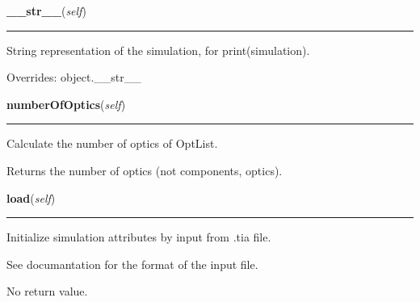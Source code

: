     \vspace{0.5ex}

\hspace{.8\funcindent}\begin{boxedminipage}{\funcwidth}

    \raggedright \textbf{\_\_str\_\_}(\textit{self})

    \vspace{-1.5ex}

    \rule{\textwidth}{0.5\fboxrule}
\setlength{\parskip}{2ex}
    String representation of the simulation, for print(simulation).

\setlength{\parskip}{1ex}
      Overrides: object.\_\_str\_\_

    \end{boxedminipage}

    \label{theia:running:simulation:Simulation:numberOfOptics}

    \vspace{0.5ex}

\hspace{.8\funcindent}\begin{boxedminipage}{\funcwidth}

    \raggedright \textbf{numberOfOptics}(\textit{self})

    \vspace{-1.5ex}

    \rule{\textwidth}{0.5\fboxrule}
\setlength{\parskip}{2ex}
    Calculate the number of optics of OptList.

    Returns the number of optics (not components, optics).

\setlength{\parskip}{1ex}
    \end{boxedminipage}

    \label{theia:running:simulation:Simulation:load}

    \vspace{0.5ex}

\hspace{.8\funcindent}\begin{boxedminipage}{\funcwidth}

    \raggedright \textbf{load}(\textit{self})

    \vspace{-1.5ex}

    \rule{\textwidth}{0.5\fboxrule}
\setlength{\parskip}{2ex}
    Initialize simulation attributes by input from .tia file.

    See documantation for the format of the input file.

    No return value.

\setlength{\parskip}{1ex}
    \end{boxedminipage}

